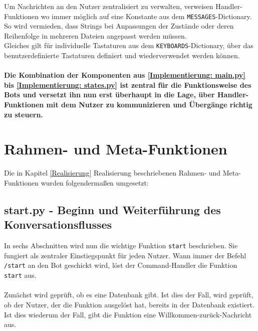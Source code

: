             Um Nachrichten an den Nutzer zentralisiert zu verwalten, verweisen Handler-Funktionen wo immer möglich auf eine Konstante aus dem \verb|MESSAGES|-Dictionary. So wird vermieden, dass Strings bei Anpassungen der Zustände oder deren Reihenfolge in mehreren Dateien angepasst werden müssen.\\
        
            Gleiches gilt für individuelle Tastaturen aus dem \verb|KEYBOARDS|-Dictionary, über das benutzerdefinierte Tastaturen definiert und wiederverwendet werden können.\\ \\
            
            \textbf{Die Kombination der Komponenten aus \ref*{Implementierung: main.py} bis \ref*{Implementierung: states.py}  ist zentral für die Funktionsweise des Bots und versetzt ihn nun erst überhaupt in die Lage, über Handler-Funktionen mit dem Nutzer zu kommunizieren und Übergänge richtig zu steuern.}











    \section{Rahmen- und Meta-Funktionen}
        Die in Kapitel \ref*{Realisierung} Realisierung beschriebenen Rahmen- und Meta-Funktionen wurden folgendermaßen umgesetzt:

        \subsection{start.py - Beginn und Weiterführung des Konversationsflusses} \label{Implementierung: start.py}
        In sechs Abschnitten wird nun die wichtige Funktion \verb|start| beschrieben. Sie fungiert als zentraler Einstiegspunkt für jeden Nutzer. Wann immer der Befehl \verb|/start| an den Bot geschickt wird, löst der Command-Handler die Funktion \verb|start| aus.\\ \\
        Zunächst wird geprüft, ob es eine Datenbank gibt. Ist dies der Fall, wird geprüft, ob der Nutzer, der die Funktion ausgelöst hat, bereits in der Datenbank existiert. Ist dies wiederum der Fall, gibt die Funktion eine Willkommen-zurück-Nachricht aus.

